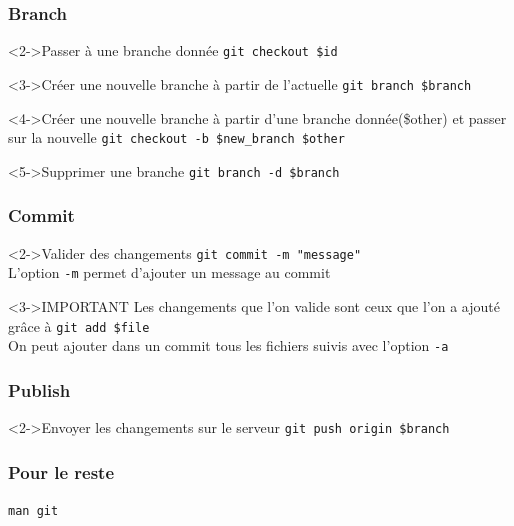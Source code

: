 		\begin{frame}[fragile]
			\frametitle{Branch}
			\begin{block}<2->{Passer à une branche donnée}
				\verb'git checkout $id'
			\end{block}
			\begin{block}<3->{Créer une nouvelle branche à partir de l'actuelle}
				\verb'git branch $branch'
			\end{block}
			\begin{block}<4->{Créer une nouvelle branche à partir d'une branche donnée(\$other) et passer sur la nouvelle}
				\verb'git checkout -b $new_branch $other'
			\end{block}
			\begin{alertblock}<5->{Supprimer une branche}
				\verb'git branch -d $branch'
			\end{alertblock}

			
		\end{frame}

		\begin{frame}[fragile]
			\frametitle{Commit}
			\begin{block}<2->{Valider des changements}
				\verb'git commit -m "message"'\\
				L'option \verb'-m' permet d'ajouter un message au commit				
			\end{block}
			\begin{alertblock}<3->{IMPORTANT}
				Les changements que l'on valide sont ceux que l'on a ajouté grâce à \verb'git add $file'\\
				On peut ajouter dans un commit tous les fichiers suivis avec l'option \verb'-a'
			\end{alertblock}
			
		\end{frame}

		\begin{frame}[fragile]
			\frametitle{Publish}
			\begin{block}<2->{Envoyer les changements sur le serveur}
				\verb'git push origin $branch'\\	
			\end{block}
		\end{frame}
		
		\begin{frame}[fragile]
		  \frametitle{Pour le reste}
		  
		  \begin{block}{}
		   \verb'man git'
		  \end{block}
		  
		\end{frame}


